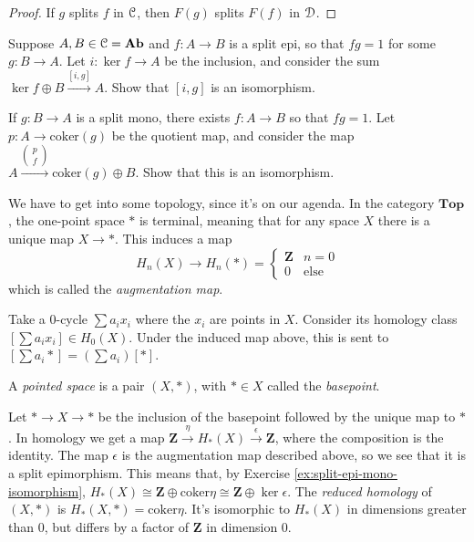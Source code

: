 \begin{proof}
If $g$ splits $f$ in $\mathcal C$, then $F(g)$ splits $F(f)$ in $\mathcal D$.
\end{proof}
\begin{exercise}\label{ex:split-epi-mono-isomorphism}
Suppose $A,B\in \mathcal C=\mathbf{Ab}$ and $f:A\to B$ is a split epi, so that $fg=1$ for some $g\colon B\rightarrow A$. Let $i\colon \ker f\to A$ be the inclusion, and consider the sum $\ker f\oplus B\xrightarrow{[i,g]} A$. Show that $[i,g]$ is an isomorphism.

If $g:B\to A$ is a split mono, there exists $f:A\to B$ so that $fg=1$. Let $p\colon A\rightarrow \mathrm{coker}(g)$ be the quotient map, and consider the map $A\xrightarrow{\begin{pmatrix}
p \\ f
\end{pmatrix}}\mathrm{coker}(g)\oplus B$. Show that this is an isomorphism.
\end{exercise}
We have to get into some topology, since it's on our agenda. In the category $\mathbf{Top}$, the one-point space $\ast$ is terminal, meaning that for any space $X$ there is a unique map $X\to\ast$. This induces a map
\[H_n(X)\to H_n(\ast)=\begin{cases}\mathbf{Z} & n=0\\
0 & \text{else}\end{cases}\]
which is called the \emph{augmentation map}.

Take a 0-cycle $\sum a_ix_i$ where the $x_i$ are points in $X$. Consider its homology class $\left[\sum a_ix_i\right]\in H_0(X)$. Under the induced map above, this is sent to $\left[\sum a_i\ast\right]=\left(\sum a_i\right)\left[\ast\right]$. 
\begin{definition}
A \emph{pointed space} is a pair $(X,\ast)$, with $\ast\in X$ called the \emph{basepoint}.
\end{definition}
Let $\ast\to X\to\ast$ be the inclusion of the basepoint followed by the unique map to $\ast$. In homology we get a map $\mathbf{Z}\xrightarrow{\eta} H_\ast(X)\xrightarrow{\epsilon}\mathbf{Z}$, where the composition is the identity. The map $\epsilon$ is the augmentation map described above, so we see that it is a split epimorphism. This means that, by Exercise \ref{ex:split-epi-mono-isomorphism}, $ H_\ast(X)\cong \mathbf{Z}\oplus\mathrm{coker}\eta \cong\mathbf{Z}\oplus\ker\epsilon$. The \emph{reduced homology} of $(X,\ast)$ is $ H_\ast(X,\ast)=\mathrm{coker}\eta$. It's isomorphic to $ H_\ast(X)$ in dimensions greater than $0$, but differs by a factor of $\mathbf{Z}$ in dimension $0$.

